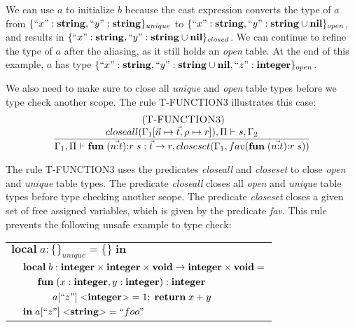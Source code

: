 We can use $a$ to initialize $b$ because the cast expression converts
the type of $a$ from $\{``x":\mathbf{string}, ``y":\mathbf{string}\}_{unique}$ to
$\{``x":\mathbf{string}, ``y":\mathbf{string} \cup \mathbf{nil}\}_{open}$, and results in
$\{``x":\mathbf{string}, ``y":\mathbf{string} \cup \mathbf{nil}\}_{closed}$.
We can continue to refine the type of $a$ after the aliasing,
as it still holds an \emph{open} table.
At the end of this example, $a$ has type
$\{``x":\mathbf{string}, ``y":\mathbf{string} \cup \mathbf{nil}, ``z":\mathbf{integer}\}_{open}$.

We also need to make sure to close all \emph{unique} and \emph{open}
table types before we type check another scope.
The rule \textsc{T-FUNCTION3} illustrates this case:
\[
\begin{array}{c}
\; (\textsc{T-FUNCTION3})\\
\dfrac{closeall(\Gamma_{1}[\vec{n} \mapsto \vec{t}, \rho \mapsto r]), \Pi \vdash s, \Gamma_{2}}
      {\Gamma_{1}, \Pi \vdash \mathbf{fun} \; (\vec{n{:}t}){:}r \; s:\vec{t} \rightarrow r, closeset(\Gamma_{1}, fav(\mathbf{fun} \; (\vec{n{:}t}){:}r \; s))}
\end{array}
\]

The rule \textsc{T-FUNCTION3} uses the predicates \emph{closeall}
and \emph{closeset} to close \emph{open} and \emph{unique} table types.
The predicate \emph{closeall} closes all \emph{open} and \emph{unique}
table types before type checking another scope.
The predicate \emph{closeset} closes a given set of free assigned variables,
which is given by the predicate \emph{fav}.
This rule prevents the following unsafe example to type check:
\begin{center}
\begin{tabular}{llll}
\multicolumn{4}{l}{$\mathbf{local} \; a:\{\}_{unique} = \{\} \; \mathbf{in}$}\\
& \multicolumn{3}{l}{$\mathbf{local} \; b:\mathbf{integer} \times \mathbf{integer} \times \mathbf{void} \rightarrow \mathbf{integer} \times \mathbf{void} =$}\\
& & \multicolumn{2}{l}{$\mathbf{fun} \; (x:\mathbf{integer}, y:\mathbf{integer}):\mathbf{integer}$}\\
& & & \multicolumn{1}{l}{$a[``z"] \; {<}\mathbf{integer}{>} = 1; \; \mathbf{return} \; x + y$}\\
& \multicolumn{3}{l}{$\mathbf{in} \; a[``z"] \; {<}\mathbf{string}{>} = ``foo"$}
\end{tabular}
\end{center}


